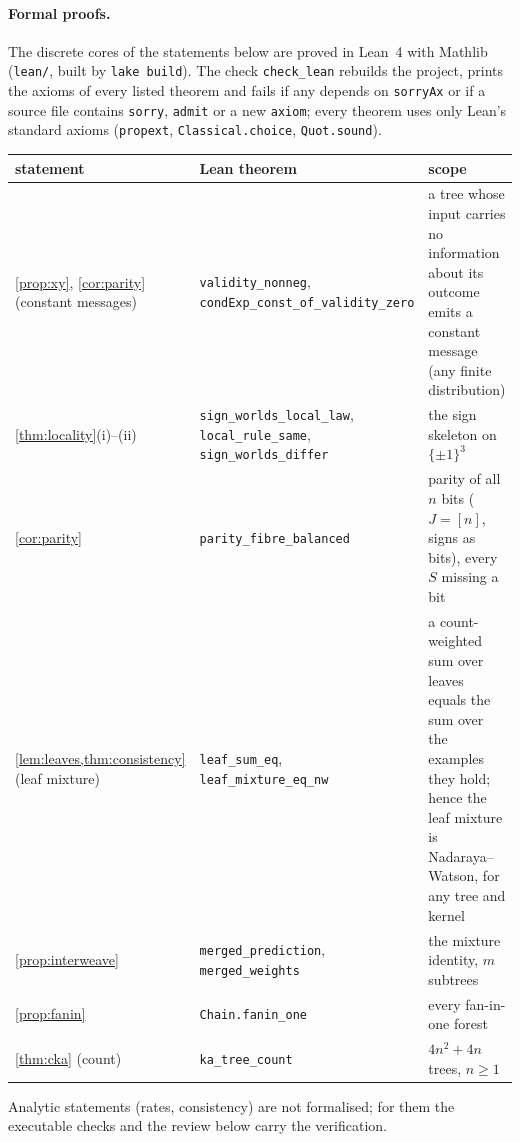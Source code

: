 \documentclass[11pt]{article}
\theoremstyle{definition}
\theoremstyle{remark}
\begin{document}
\paragraph{Formal proofs.}
The discrete cores of the statements below are proved in Lean~4 with Mathlib
\citep{moura2021lean4,mathlib2020} (\texttt{lean/}, built by \texttt{lake build}).  The
check \texttt{check\_lean} rebuilds the project, prints the axioms of every listed theorem and
fails if any depends on \texttt{sorryAx} or if a source file contains \texttt{sorry},
\texttt{admit} or a new \texttt{axiom}; every theorem uses only Lean's standard axioms
(\texttt{propext}, \texttt{Classical.choice}, \texttt{Quot.sound}).
\begin{center}\small
\begin{tabular}{@{}p{3.3cm}p{5.4cm}p{6.4cm}@{}}\toprule
statement & Lean theorem & scope\\\midrule
\cref{prop:xy}, \cref{cor:parity} (constant messages) & \texttt{validity\_nonneg}, \texttt{condExp\_const\_of\_validity\_zero} & a tree whose input carries no information about its outcome emits a constant message (any finite distribution)\\
\cref{thm:locality}(i)--(ii) & \texttt{sign\_worlds\_local\_law}, \texttt{local\_rule\_same}, \texttt{sign\_worlds\_differ} & the sign skeleton on $\{\pm1\}^3$\\
\cref{cor:parity} & \texttt{parity\_fibre\_balanced} & parity of all $n$ bits ($J=[n]$, signs as bits), every $S$ missing a bit\\
\cref{lem:leaves,thm:consistency} (leaf mixture) & \texttt{leaf\_sum\_eq}, \texttt{leaf\_mixture\_eq\_nw} & a count-weighted sum over leaves equals the sum over the examples they hold; hence the leaf mixture is Nadaraya--Watson, for any tree and kernel\\
\cref{prop:interweave} & \texttt{merged\_prediction}, \texttt{merged\_weights} & the mixture identity, $m$ subtrees\\
\cref{prop:fanin} & \texttt{Chain.fanin\_one} & every fan-in-one forest\\
\cref{thm:cka} (count) & \texttt{ka\_tree\_count} & $4n^2+4n$ trees, $n\ge1$\\
\bottomrule
\end{tabular}
\end{center}
Analytic statements (rates, consistency) are not formalised; for them the executable
checks and the review below carry the verification.
\end{document}
